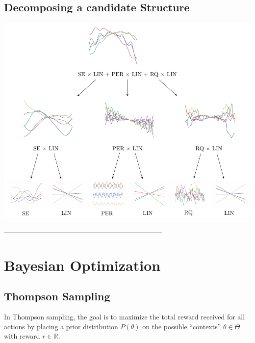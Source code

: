 \documentclass[a0,portrait]{a0poster}
\newcommand{\R}{\mathbb{R}}
\begin{document}
\begin{multicols}{2}
 \subsection*{Decomposing a candidate Structure}
\begin{center}\vspace{1cm}
\includegraphics[width=0.7\linewidth]{parseTree.pdf}
\end{center}\vspace{1cm}
 



---------------------------------------------------------------------

\section*{Bayesian Optimization}

\subsection*{Thompson Sampling}
In Thompson sampling, the goal is to maximize the total reward received for all actions by placing a prior distribution $P(\theta)$ on the possible ``contexts'' $\theta \in \Theta$ with reward  $r \in \R$.


\end{multicols}
\end{document}
